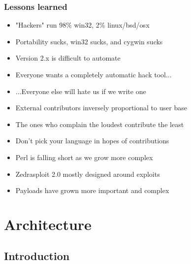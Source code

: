 \documentclass{beamer}
\newenvironment{sitemize}{\vspace{1mm}\begin{itemize}\itemsep 4pt\small}{\end{itemize}}
\begin{document}
\begin{frame}[t]
  \frametitle{Lessons learned}
  
  \begin{sitemize}
    \item "Hackers" run 98\% win32, 2\% linux/bsd/osx
    \item Portability sucks, win32 sucks, and cygwin sucks
  \end{sitemize}
  \pause
  \begin{sitemize}
    \item Version 2.x is difficult to automate
    \item Everyone wants a completely automatic hack tool...
    \pause
    \item ...Everyone else will hate us if we write one
  \end{sitemize}
  \pause
  \begin{sitemize}
    \item External contributors inversely proportional to user base
    \item The ones who complain the loudest contribute the least
    \pause
    \item Don't pick your language in hopes of contributions
    \item Perl is falling short as we grow more complex
  \end{sitemize}
  \pause
  \begin{sitemize}
    \item Zedrasploit 2.0 mostly designed around exploits
    \item Payloads have grown more important and complex
  \end{sitemize}
  
\end{frame}

\section{Architecture}
\subsection{Introduction}
\end{document}
